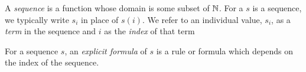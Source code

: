 \guard



\begin{defn}
\label{defn:sequence}
  A \emph{sequence} is a function whose domain is some subset of $\mathbb{N}$.
  For a $s$ is a sequence, we typically write $s_i$ in place of $s(i)$.
  We refer to an individual value, $s_i$, as a \emph{term} in the sequence and $i$ as the \emph{index} of that term
\end{defn}

For a sequence $s$, an \emph{explicit formula} of $s$ is a rule or formula which depends on the index of the sequence.
